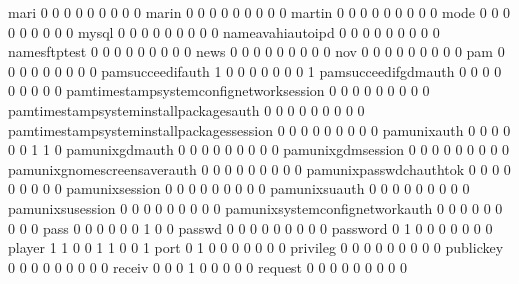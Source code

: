 \documentclass[compress,8pt]{beamer}
\begin{document}
\begin{frame}
\begin{Schunk}
  mari                                       0   0   0   0   0   0   0   0   0
  marin                                      0   0   0   0   0   0   0   0   0
  martin                                     0   0   0   0   0   0   0   0   0
  mode                                       0   0   0   0   0   0   0   0   0
  mysql                                      0   0   0   0   0   0   0   0   0
  nameavahiautoipd                           0   0   0   0   0   0   0   0   0
  namesftptest                               0   0   0   0   0   0   0   0   0
  news                                       0   0   0   0   0   0   0   0   0
  nov                                        0   0   0   0   0   0   0   0   0
  pam                                        0   0   0   0   0   0   0   0   0
  pamsucceedifauth                           1   0   0   0   0   0   0   0   1
  pamsucceedifgdmauth                        0   0   0   0   0   0   0   0   0
  pamtimestampsystemconfignetworksession     0   0   0   0   0   0   0   0   0
  pamtimestampsysteminstallpackagesauth      0   0   0   0   0   0   0   0   0
  pamtimestampsysteminstallpackagessession   0   0   0   0   0   0   0   0   0
  pamunixauth                                0   0   0   0   0   0   1   1   0
  pamunixgdmauth                             0   0   0   0   0   0   0   0   0
  pamunixgdmsession                          0   0   0   0   0   0   0   0   0
  pamunixgnomescreensaverauth                0   0   0   0   0   0   0   0   0
  pamunixpasswdchauthtok                     0   0   0   0   0   0   0   0   0
  pamunixsession                             0   0   0   0   0   0   0   0   0
  pamunixsuauth                              0   0   0   0   0   0   0   0   0
  pamunixsusession                           0   0   0   0   0   0   0   0   0
  pamunixsystemconfignetworkauth             0   0   0   0   0   0   0   0   0
  pass                                       0   0   0   0   0   0   1   0   0
  passwd                                     0   0   0   0   0   0   0   0   0
  password                                   0   1   0   0   0   0   0   0   0
  player                                     1   1   0   0   1   1   0   0   1
  port                                       0   1   0   0   0   0   0   0   0
  privileg                                   0   0   0   0   0   0   0   0   0
  publickey                                  0   0   0   0   0   0   0   0   0
  receiv                                     0   0   0   1   0   0   0   0   0
  request                                    0   0   0   0   0   0   0   0   0

\end{Schunk}
\end{frame}
\end{document}
